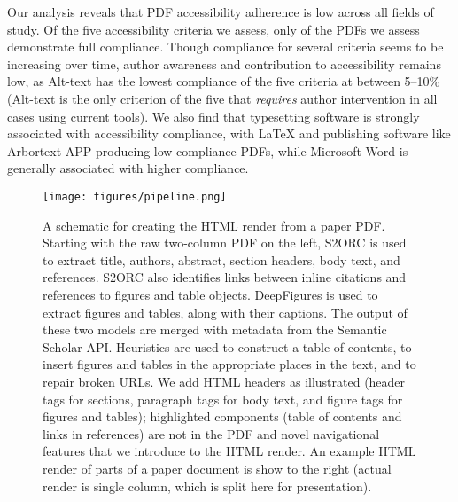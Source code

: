 Our analysis reveals that PDF accessibility adherence is low across all fields of study. Of the five accessibility criteria we assess, only \percaccessible of the PDFs we assess demonstrate full compliance. Though compliance for several criteria seems to be increasing over time, author awareness and contribution to accessibility remains low, as Alt-text has the lowest compliance of the five criteria at between 5--10\% (Alt-text is the only criterion of the five that \textit{requires} author intervention in all cases using current tools). We also find that typesetting software is strongly associated with accessibility compliance, with LaTeX and publishing software like Arbortext APP producing low compliance PDFs, while Microsoft Word is generally associated with higher compliance.


\begin{figure}[t!]
    \centering
    \texttt{[image: figures/pipeline.png]}
    \caption{A schematic for creating the \scially HTML render from a paper PDF. Starting with the raw two-column PDF on the left, S2ORC \citep{lo-wang-2020-s2orc} is used to extract title, authors, abstract, section headers, body text, and references. S2ORC also identifies links between inline citations and references to figures and table objects. DeepFigures \citep{Siegel2018ExtractingSF} is used to extract figures and tables, along with their captions. The output of these two models are merged with metadata from the Semantic Scholar API. Heuristics are used to construct a table of contents, to insert figures and tables in the appropriate places in the text, and to repair broken URLs. We add HTML headers as illustrated (header tags for sections, paragraph tags for body text, and figure tags for figures and tables); highlighted components (table of contents and links in references) are not in the PDF and novel navigational features that we introduce to the HTML render. An example HTML render of parts of a paper document is show to the right (actual render is single column, which is split here for presentation).}
    \label{fig:pipeline}
\end{figure}


